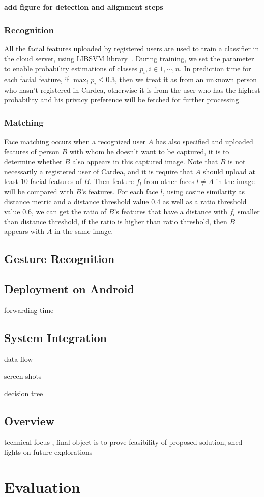 {\bfseries add figure for detection and alignment steps}

\subsubsection{Recognition}
All the facial features uploaded by registered users are used to train a classifier in the cloud server, using LIBSVM library~\cite{chang2011libsvm}. During training, we set the parameter to enable probability estimations of classes $p_i, i\in{1, \cdots, n}$. In prediction time for each facial feature, if $\max_ip_i \leq 0.3$, then we treat it as from an unknown person who hasn't registered in Cardea, otherwise it is from the user who has the highest probability and his privacy preference will be fetched for further processing.

\subsubsection{Matching}
Face matching occurs when a recognized user $A$ has also specified and uploaded features of person $B$ with whom he doesn't want to be captured, it is to determine whether $B$ also appears in this captured image. Note that $B$ is not necessarily a registered user of Cardea, and it is require that $A$ should upload at least 10 facial features of $B$. Then feature $f_l$ from other faces $l\neq A$ in the image will be compared with $B$'s features. For each face $l$, using cosine similarity as distance metric and a distance threshold value 0.4 as well as a ratio threshold value 0.6, we can get the ratio of $B$'s features that have a distance with $f_l$ smaller than distance threshold, if the ratio is higher than ratio threshold, then $B$ appears with $A$ in the same image.


\subsection{Gesture Recognition}


\subsection{Deployment on Android}

forwarding time

\subsection{System Integration}

data flow

screen shots

decision tree



\subsection{Overview}
technical focus , final object is to prove feasibility of proposed solution, shed lights on future explorations

\section{Evaluation}


\newpage
